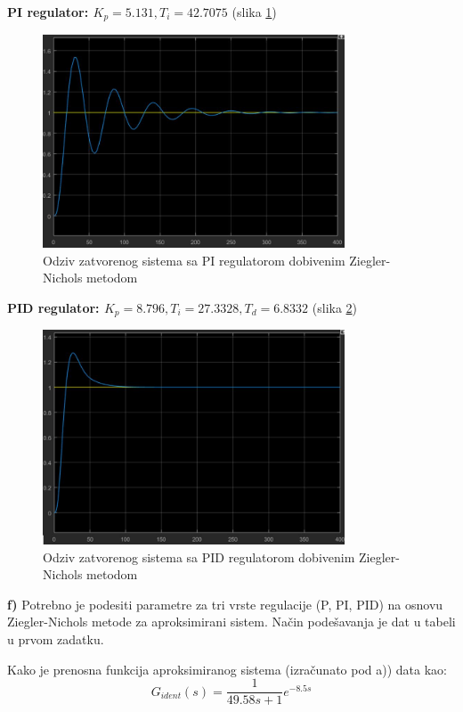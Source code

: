 \textbf{PI regulator: $K_p=5.131, T_i=42.7075$} (slika \ref{fig:z2_17})

\begin{figure} [H]
  \centering
  \includegraphics[width=0.8\textwidth]{z2_17}
  \caption{Odziv zatvorenog sistema sa PI regulatorom dobivenim Ziegler-Nichols metodom}
  \label{fig:z2_17}
\end{figure}

\textbf{PID regulator: $K_p=8.796, T_i=27.3328, T_d=6.8332$} (slika \ref{fig:z2_18})
 
\begin{figure} [H]
  \centering
  \includegraphics[width=0.8\textwidth]{z2_18}
  \caption{Odziv zatvorenog sistema sa PID regulatorom dobivenim Ziegler-Nichols metodom}
  \label{fig:z2_18}
\end{figure}

\textbf{f)} Potrebno je podesiti parametre za tri vrste regulacije (P, PI, PID) na osnovu Ziegler-Nichols metode za aproksimirani sistem. Način podešavanja je dat u tabeli u prvom zadatku.

Kako je prenosna funkcija aproksimiranog sistema (izračunato pod a)) data kao:
	\[G_{ident} (s)=\frac{1}{49.58s+1} e^{-8.5s}\]

